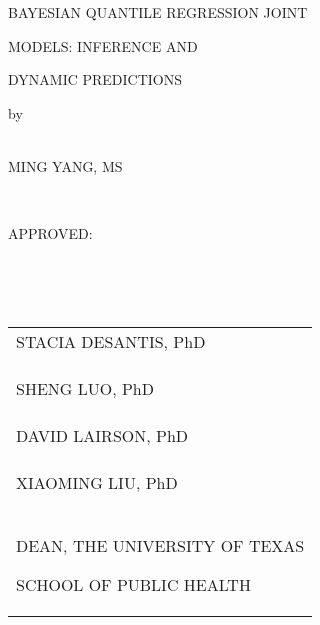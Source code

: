 \begin{center}
{\normalsize BAYESIAN QUANTILE REGRESSION JOINT\par
MODELS: INFERENCE AND\par
DYNAMIC PREDICTIONS}
\end{center}\par

{\normalsize
\begin{center}
\singlespacing
by\\
\ \par
MING YANG, MS\par
\ \par
APPROVED:\par
\ \par
\ \par
\end{center}}

\begin{table}[h]
\begin{flushright}
	\begin{tabular}{ p{8cm}}

	\hline
	STACIA DESANTIS, PhD\\
	\\
	\\
	\\
	\hline
	SHENG LUO, PhD\\
	\\
	\\
	\\
	\hline
	DAVID LAIRSON, PhD\\
	\\
	\\
	\\
	\hline
	XIAOMING LIU, PhD\\
	\\
	\\
	\\
	\hline
	DEAN, THE UNIVERSITY OF TEXAS\par
	SCHOOL OF PUBLIC HEALTH\\[0.8cm]
\end{tabular}
\end{flushright}
\label{default}
\end{table}

